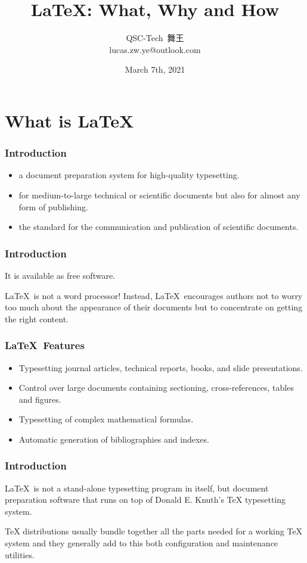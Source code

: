 \documentclass{beamer}
\title{\LaTeX: What, Why and How}
\author{ QSC-Tech\ 舞王\\ lucas.zw.ye@outlook.com }
\date{March 7th, 2021}
\begin{document}
\begin{frame}
\titlepage
\end{frame}

\section{What is \LaTeX}

\begin{frame}
\frametitle{Introduction}
\begin{itemize}
	\item a document preparation system for high-quality typesetting.
	\item for medium-to-large technical or scientific documents but also for almost any form of publishing.
	\item the standard for the communication and publication of scientific documents. 
\end{itemize}
\end{frame}

\begin{frame}
\frametitle{Introduction}
It is available as free software.

\LaTeX\ is not a word processor! Instead, \LaTeX\ encourages authors not to worry too much about the appearance of their documents but to concentrate on getting the right content.
\end{frame}

\begin{frame}
\frametitle{\LaTeX\ Features}
\begin{itemize}
	\item Typesetting journal articles, technical reports, books, and slide presentations.
	\item Control over large documents containing sectioning, cross-references, tables and figures.
	\item Typesetting of complex mathematical formulas.
	\item Automatic generation of bibliographies and indexes.
\end{itemize}
\end{frame}

\begin{frame}
\frametitle{Introduction}
\LaTeX\ is not a stand-alone typesetting program in itself, but document preparation software that runs on top of Donald E. Knuth's TeX typesetting system. 

TeX distributions usually bundle together all the parts needed for a working TeX system and they generally add to this both configuration and maintenance utilities.
\end{frame}
\end{document}
